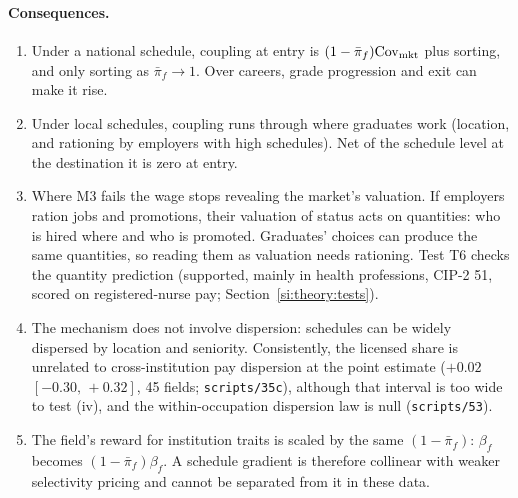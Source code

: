 \documentclass[11pt]{article}
\newcommand{\ci}[2]{$[#1,\allowbreak\,#2]$}
\begin{document}
\paragraph{Consequences.}
\begin{enumerate}
\item[(i)] Under a national schedule, coupling at entry is $(1-\bar\pi_f)\mathrm{Cov}_{\rm mkt}$ plus sorting, and
only sorting as $\bar\pi_f\to1$. Over careers, grade progression and exit can make it rise.
\item[(ii)] Under local schedules, coupling runs through where graduates work (location, and rationing by employers
with high schedules). Net of the schedule level at the destination it is zero at entry.
\item[(iii)] Where M3 fails the wage stops revealing the market's valuation. If employers ration jobs and
promotions, their valuation of status acts on quantities: who is hired where and who is promoted. Graduates' choices can produce the same quantities, so reading them as valuation needs rationing. Test T6 checks
the quantity prediction (supported, mainly in health professions, CIP-2 51, scored on registered-nurse pay;
Section~\ref{si:theory:tests}).
\item[(iv)] The mechanism does not involve dispersion: schedules can be widely dispersed by location and seniority.
Consistently, the licensed share is unrelated to cross-institution pay dispersion at the point estimate ($+0.02$
\ci{-0.30}{+0.32}, 45 fields; \texttt{scripts/35c}), although that interval is too wide to test (iv), and the
within-occupation dispersion law is null (\texttt{scripts/53}).
\item[(v)] The field's reward for institution traits is scaled by the same $(1-\bar\pi_f)$: $\beta_f$ becomes
$(1-\bar\pi_f)\beta_f$. A schedule gradient is therefore collinear with weaker selectivity pricing and cannot be
separated from it in these data.
\end{enumerate}
\end{document}
